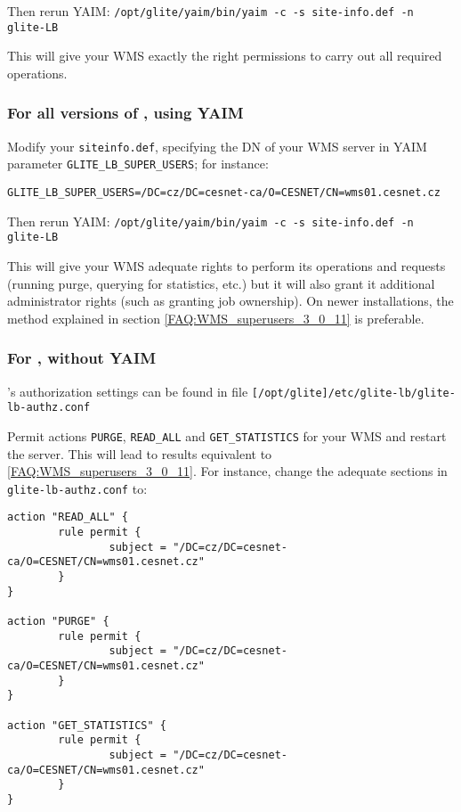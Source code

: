 Then rerun YAIM: 
\texttt{/opt/glite/yaim/bin/yaim -c -s site-info.def -n glite-LB}

 This will give your WMS exactly the right permissions to carry out all required operations.

\subsubsection{For all versions of \LB, using YAIM}

Modify your \texttt{siteinfo.def}, specifying the DN of your WMS server in YAIM parameter \texttt{GLITE\_LB\_SUPER\_USERS}; for instance:

\begin{center}
\texttt{GLITE\_LB\_SUPER\_USERS=/DC=cz/DC=cesnet-ca/O=CESNET/CN=wms01.cesnet.cz}
\end{center}

Then rerun YAIM: 
\texttt{/opt/glite/yaim/bin/yaim -c -s site-info.def -n glite-LB}

This will give your WMS adequate rights to perform its operations and requests (running purge, querying for statistics, etc.) but it will also grant it additional administrator rights (such as granting job ownership). On newer installations, the method explained in section \ref{FAQ:WMS_superusers_3_0_11} is preferable.

\subsubsection{For , without YAIM}

\LB{}'s authorization settings can be found in file \texttt{[/opt/glite]/etc/glite-lb/glite-lb-authz.conf}

Permit actions \texttt{PURGE}, \texttt{READ\_ALL} and \texttt{GET\_STATISTICS} for your WMS and restart the \LB server.
This will lead to results equivalent to \ref{FAQ:WMS_superusers_3_0_11}.
For instance, change the adequate sections in \texttt{glite-lb-authz.conf} to:

\begin{verbatim}
action "READ_ALL" {
        rule permit {
                subject = "/DC=cz/DC=cesnet-ca/O=CESNET/CN=wms01.cesnet.cz"
        }
}

action "PURGE" {
        rule permit {
                subject = "/DC=cz/DC=cesnet-ca/O=CESNET/CN=wms01.cesnet.cz"
        }
}

action "GET_STATISTICS" {
        rule permit {
                subject = "/DC=cz/DC=cesnet-ca/O=CESNET/CN=wms01.cesnet.cz"
        }
}
\end{verbatim}

